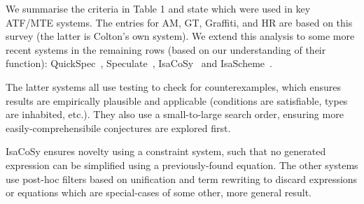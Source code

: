 %
%
%
%


We summarise the criteria in Table 1 and state which were used in key
ATF/MTE systems. The entries for AM, GT, Graffiti, \Bagai{} and HR are based
on this survey (the latter is Colton's own system). We extend this analysis to
some more recent systems in the remaining rows (based on our understanding of
their function): QuickSpec~\cite{QuickSpec},
Speculate~\cite{braquehais2017speculate},
IsaCoSy~\cite{Johansson.Dixon.Bundy:conjecture-generation}
and IsaScheme~\cite{MontanoRivas2011}.

The latter systems all use testing to check for counterexamples, which ensures
results are empirically plausible and applicable (conditions are satisfiable,
types are inhabited, etc.). They also use a small-to-large search order,
ensuring more easily-comprehensibile conjectures are explored first.

IsaCoSy ensures novelty using a constraint system, such that no generated
expression can be simplified using a previously-found equation. The other
systems use post-hoc filters based on unification and term rewriting to discard
expressions or equations which are special-cases of some other, more general
result.

